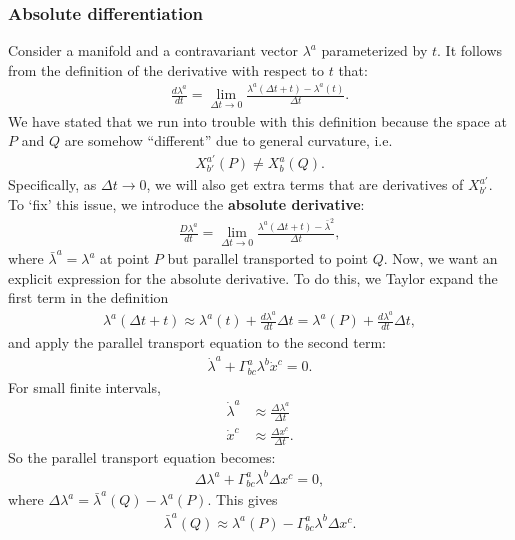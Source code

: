 \documentclass{article}
\theoremstyle{definition}
\begin{document}
\subsubsection{Absolute differentiation}
Consider a manifold and a contravariant vector $\lambda^a$ parameterized by $t$. It follows from the definition of the derivative with respect to $t$ that:
\begin{align*}
\frac{d\lambda^a}{dt} = \lim\limits_{\Delta t \rightarrow 0} \frac{\lambda^a(\Delta t+t) - \lambda^a(t)}{\Delta t}.
\end{align*}
We have stated that we run into trouble with this definition because the space at $P$ and $Q$ are somehow ``different'' due to general curvature, i.e.
\begin{align*}
X^{a'}_{b'}(P) \neq X^{a}_{b}(Q).
\end{align*}
Specifically, as $\Delta t \rightarrow 0$, we will also get extra terms that are derivatives of $X^{a'}_{b'}$. To `fix' this issue, we introduce the \textbf{absolute derivative}:
\begin{align*}
\frac{D\lambda^a}{dt} = \lim\limits_{\Delta t \rightarrow 0}\frac{\lambda^a(\Delta t + t) - \bar{\lambda}^2}{\Delta t},
\end{align*}
where $\bar{\lambda}^a = \lambda^a$ at point $P$ but parallel transported to point $Q$. Now, we want an explicit expression for the absolute derivative. To do this, we Taylor expand the first term in the definition
\begin{align*}
\lambda^a(\Delta t + t) \approx \lambda^a(t) + \frac{d\lambda^a}{dt}\Delta t = \lambda^a(P) + \frac{d\lambda^a}{dt}\Delta t,
\end{align*}
and apply the parallel transport equation to the second term:
\begin{align*}
\dot{\lambda}^a + \Gamma^a_{bc}\lambda^b\dot{x}^c = 0.
\end{align*}
For small finite intervals, 
\begin{align*}
\dot{\lambda}^a &\approx \frac{\Delta \lambda^a}{\Delta t}\\
\dot{x}^c &\approx \frac{\Delta x^c}{\Delta t}.
\end{align*}
So the parallel transport equation becomes:
\begin{align*}
\Delta \lambda^a + \Gamma^a_{bc}\lambda^b\Delta x^c = 0,
\end{align*}
where $\Delta \lambda^a = \bar{\lambda}^a(Q) - \lambda^a(P)$. This gives
\begin{align*}
\bar{\lambda}^a(Q) \approx \lambda^a(P) - \Gamma^a_{bc}\lambda^b\Delta x^c.
\end{align*}
\end{document}
